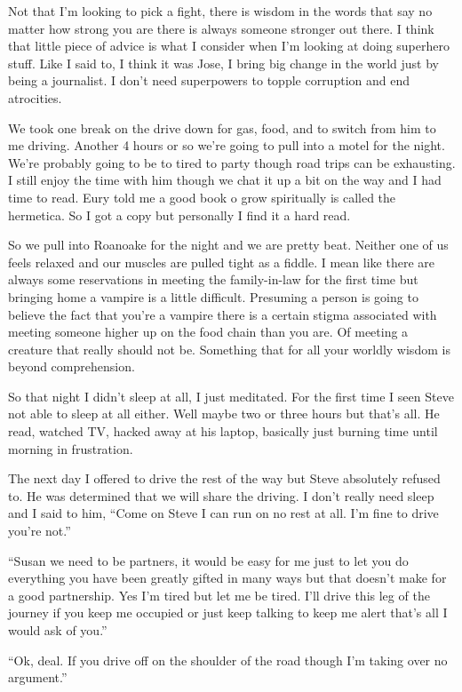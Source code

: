 Not that I'm looking to pick a fight, there is wisdom in the words that say no matter how strong you are there is always someone stronger out there. I think that little piece of advice is what I consider when I'm looking at doing superhero stuff. Like I said to, I think it was Jose, I bring big change in the world just by being a journalist. I don't need superpowers to topple corruption and end atrocities.

We took one break on the drive down for gas, food, and to switch from him to me driving. Another 4 hours or so we're going to pull into a motel for the night. We're probably going to be to tired to party though road trips can be exhausting. I still enjoy the time with him though we chat it up a bit on the way and I had time to read. Eury told me a good book o grow spiritually is called the hermetica. So I got a copy but personally I find it a hard read.

So we pull into Roanoake for the night and we are pretty beat. Neither one of us feels relaxed and our muscles are pulled tight as a fiddle. I mean like there are always some reservations in meeting the family-in-law for the first time but bringing home a vampire is a little difficult. Presuming a person is going to believe the fact that you're a vampire there is a certain stigma associated with meeting someone higher up on the food chain than you are. Of meeting a creature that really should not be. Something that for all your worldly wisdom is beyond comprehension.

So that night I didn't sleep at all, I just meditated. For the first time I seen Steve not able to sleep at all either. Well maybe two or three hours but that's all. He read, watched TV, hacked away at his laptop, basically just burning time until morning in frustration.

The next day I offered to drive the rest of the way but Steve absolutely refused to. He was determined that we will share the driving. I don't really need sleep and I said to him, ``Come on Steve I can run on no rest at all. I'm fine to drive you're not.''

``Susan we need to be partners, it would be easy for me just to let you do everything you have been greatly gifted in many ways but that doesn't make for a good partnership. Yes I'm tired but let me be tired. I'll drive this leg of the journey if you keep me occupied or just keep talking to keep me alert that's all I would ask of you.''

``Ok, deal. If you drive off on the shoulder of the road though I'm taking over no argument.''

